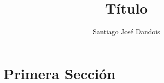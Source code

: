 \documentclass[a4paper]{article}
\title{Título}
\author{Santiago José Dandois}
\begin{document}
\section{Primera Sección}
\end{document}
